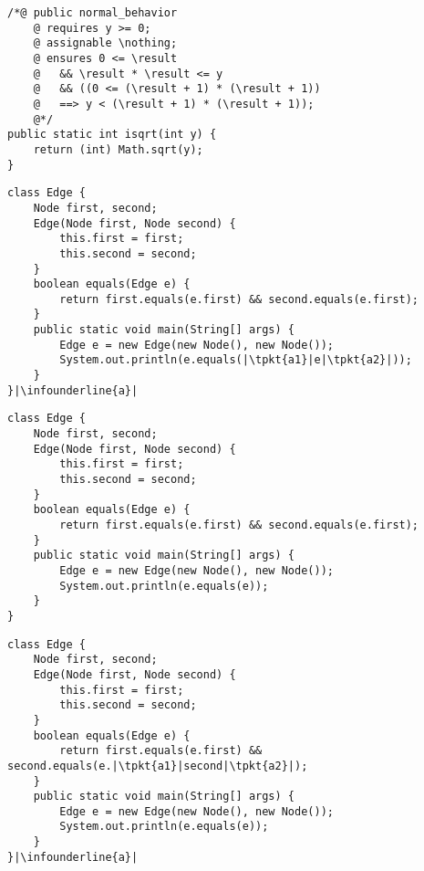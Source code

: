 \newsavebox{\jmlisqrt}
\begin{lrbox}{\jmlisqrt}
	\begin{lstlisting}
/*@ public normal_behavior
	@ requires y >= 0;
	@ assignable \nothing;
	@ ensures 0 <= \result
	@   && \result * \result <= y
	@   && ((0 <= (\result + 1) * (\result + 1))
	@   ==> y < (\result + 1) * (\result + 1));
	@*/
public static int isqrt(int y) {
	return (int) Math.sqrt(y);
}
	\end{lstlisting}
\end{lrbox}

\newsavebox{\edgeruntimeerrorfix}
\begin{lrbox}{\edgeruntimeerrorfix}
	\begin{lstlisting}
class Edge {
	Node first, second;
	Edge(Node first, Node second) {
		this.first = first;
		this.second = second;
	}
	boolean equals(Edge e) {
		return first.equals(e.first) && second.equals(e.first);
	}
	public static void main(String[] args) {
		Edge e = new Edge(new Node(), new Node());
		System.out.println(e.equals(|\tpkt{a1}|e|\tpkt{a2}|));
	}
}|\infounderline{a}|
	\end{lstlisting}
\end{lrbox}

\newsavebox{\edgelogicalerror}
\begin{lrbox}{\edgelogicalerror}
	\begin{lstlisting}
class Edge {
	Node first, second;
	Edge(Node first, Node second) {
		this.first = first;
		this.second = second;
	}
	boolean equals(Edge e) {
		return first.equals(e.first) && second.equals(e.first);
	}
	public static void main(String[] args) {
		Edge e = new Edge(new Node(), new Node());
		System.out.println(e.equals(e));
	}
}
	\end{lstlisting}
\end{lrbox}

\newsavebox{\edgelogicalerrorfix}
\begin{lrbox}{\edgelogicalerrorfix}
	\begin{lstlisting}
class Edge {
	Node first, second;
	Edge(Node first, Node second) {
		this.first = first;
		this.second = second;
	}
	boolean equals(Edge e) {
		return first.equals(e.first) && second.equals(e.|\tpkt{a1}|second|\tpkt{a2}|);
	}
	public static void main(String[] args) {
		Edge e = new Edge(new Node(), new Node());
		System.out.println(e.equals(e));
	}
}|\infounderline{a}|
	\end{lstlisting}
\end{lrbox}

